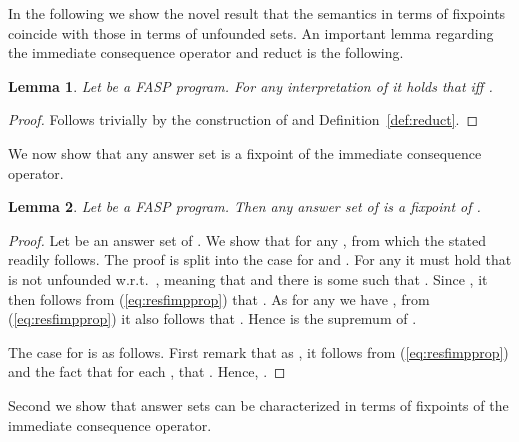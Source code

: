 \documentclass{tlp}
\newtheorem{lemma}{Lemma}
\begin{document}
In the following we show the novel result that the semantics in terms of fixpoints coincide with those in terms of unfounded sets.
An important lemma regarding the immediate consequence operator and reduct is the following.

\begin{lemma}\label{lem:notmodel-lfviolated}
 Let  be a FASP program. For any interpretation  of  it holds that  iff .
\end{lemma}
\begin{proof}
 Follows trivially by the construction of  and Definition~\ref{def:reduct}.
\end{proof}

We now show that any answer set is a fixpoint of the immediate consequence operator.

\begin{lemma}\label{lem:unfounded-fixpoint}
 Let  be a FASP program. Then any answer set  of  is a fixpoint of .
\end{lemma}
\begin{proof}
 Let  be an answer set of . We show that  for any , from which the stated readily follows. The proof is split into the case for  and . For any  it must hold that  is not unfounded w.r.t.~,
 meaning that  and there is some  such that . Since , it then follows from (\ref{eq:resfimpprop}) that . As for any  we have , from (\ref{eq:resfimpprop}) it also follows that . Hence  is the supremum of .

 The case for  is as follows. First remark that as , it follows from (\ref{eq:resfimpprop}) and the fact that  for each , that . Hence, . 
\end{proof}

Second we show that answer sets can be characterized in terms of fixpoints of the immediate consequence operator.
\end{document}
